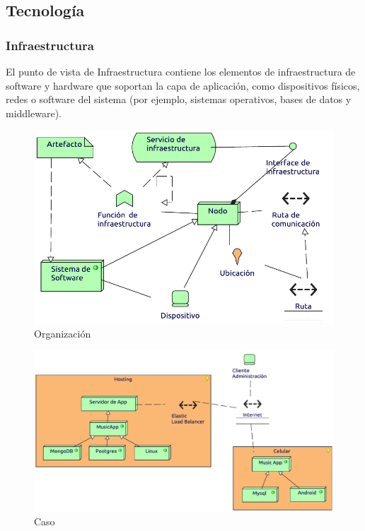 \subsection{Tecnología}

\subsubsection{Infraestructura}
El punto de vista de Infraestructura contiene los elementos de infraestructura de software y hardware que soportan la capa de aplicación, como dispositivos físicos, redes o software del sistema (por ejemplo, sistemas operativos, bases de datos y middleware).
\begin{figure}[h!]
	\centering
	\includegraphics[width=0.8\linewidth]{Desarrollo/ArquitecturaEmpresarial/Tecnologia/imgs/insfraestructuraMetamodelo.pdf}
	\caption{Organización}
\end{figure}
\newpage
{}

\begin{figure}[h!]
	\centering
	\includegraphics[width=\linewidth]{Desarrollo/ArquitecturaEmpresarial/Tecnologia/imgs/insfraestructura.pdf}
	\caption{Caso}
\end{figure}


